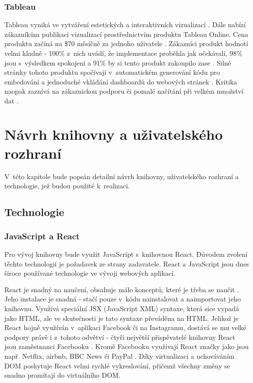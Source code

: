 \documentclass[czech, bc, kiv, he, iso690numb]{fasthesis}
\begin{document}
\subsection{Tableau}
Tableau vyniká ve vytváření estetických a interaktivních vizualizací \cite{tableauBlog}. Dále nabízí zákazníkům publikaci vizualizací prostřednictvím produktu Tableau Online. Cena produktu začíná na \$70 měsíčně za jednoho uživatele \cite{trustRadiusTableAU}. 
Zákazníci produkt hodnotí velmi kladně - 100\% z~nich uvádí, že implementace proběhla jak očekávali, 98\% jsou s~výsledkem spokojeni a 91\% by si tento produkt zakoupilo zase \cite{trustRadiusTableAU}. Silné stránky 
tohoto produktu spočívají v~automatickém generování kódu pro embedování a jednoduché vkládání dashboardů do webových stránek \cite{tableauBlog}. Kritika naopak zaznívá na zákaznickou podporu či pomalé načítání při velkém množství dat \cite{trustRadiusTableAU}.

%
%
%
%
\chapter{Návrh knihovny a uživatelského rozhraní}

V~této kapitole bude popsán detailní návrh knihovny, uživatelského rozhraní a technologie, jež budou použité k~realizaci. 

\section{Technologie}

\subsection{JavaScript a React}
Pro vývoj knihovny bude využit JavaScript s~knihovnou React. Důvodem zvolení těchto technologií je požadavek ze strany zadavatele. React a JavaScript jsou dnes
široce používané technologie ve vývoji webových aplikací. 

React je snadný na naučení, obsahuje málo konceptů, které je třeba se naučit \cite{whyUsingReact}. Jeho instalace je snadná -
stačí pouze v~kódu nainstalovat a naimportovat jeho knihovnu. Využívá speciální JSX (JavaScript XML) syntaxe, která sice vypadá jako HTML, ale ve skutečnosti je tato syntaxe převáděna na HTML. Jelikož je React hojně využíván
v~aplikaci Facebook či na Instagramu, dostává se mu velké podpory právě i z~tohoto odvětví - čtyři největší přispěvatelé knihovny React jsou zaměstnanci Facebooku \cite{whyUsingReact}. Kromě 
Facebooku využívají React značky jako jsou např. Netflix, airbnb, BBC News či PayPal \cite{whyUsingReact2}. Díky virtualizaci a uchováváním DOM poskytuje React
velmi rychlé vykreslování, přičemž všechny změny se snadno promítají do virtuálního DOM. 
\end{document}

